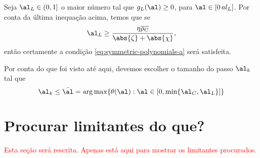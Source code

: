 Seja $\al_L\in(0,1]$ o maior número tal que  $g_L(\al)\geq 0$, para  $\al\in[0\,al_L]$. Por conta da última inequação acima, temos que se 
\[
\al_L \geq \frac{\eta\dbvec{\rho_C} }{\abs{\zeta} + \abs{\chi}},
\]
 então certamente a condição \eqref{eq:symmetric-polynomials-a} será satisfeita. 






Por conta do que foi visto até aqui, devemos escolher o tamanho do passo $\al_k$ tal que 
\begin{equation}
\label{eq:bound-alpha} 
	\al_k \leq \bar{\al} = \arg\max \{\theta(\al):\al\in[0,\min\{\al_C,\al_L\}] \}
\end{equation}





\section{Procurar limitantes do que?}

\textcolor{red}{Esta seção será rescrita. Apenas está aqui para mostrar os  limitantes procurados.}


